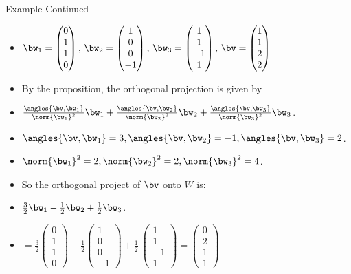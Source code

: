 \documentclass{beamer}
\begin{document}
\begin{frame}{Example Continued}
\begin{itemize}
\item $
\bw_1=
\begin{pmatrix}
0  \\
1  \\
1\\
0
\end{pmatrix}
\text{, }
\bw_2=
\begin{pmatrix}
1 \\
0\\
0 \\
-1
\end{pmatrix}
\text{, }
\bw_3=
\begin{pmatrix}
1 \\
1 \\
-1 \\
1
\end{pmatrix}
\text{, }
\bv=
\begin{pmatrix}
1 \\
1 \\
2 \\
2
\end{pmatrix}
$
\item By the proposition, the orthogonal projection is given by
\item $\frac{\angles{\bv,\bw_1}}{\norm{\bw_1}^2}\bw_1 + \frac{\angles{\bv,\bw_2}}{\norm{\bw_2}^2}\bw_2 + \frac{\angles{\bv,\bw_3}}{\norm{\bw_3}^2}\bw_3$.
\item $\angles{\bv,\bw_1}=3,\angles{\bv,\bw_2}=-1,\angles{\bv,\bw_3}=2$.
\item $\norm{\bw_1}^2=2,\norm{\bw_2}^2=2,\norm{\bw_3}^2=4$.
\item So the orthogonal project of $\bv$ onto $W$ is:
\item $\frac{3}{2}\bw_1 - \frac{1}{2}\bw_2 + \frac{1}{2}\bw_3$.
\item  $ =
\frac{3}{2}
\begin{pmatrix}
0  \\
1  \\
1\\
0
\end{pmatrix}
- \frac{1}{2}
\begin{pmatrix}
1 \\
0\\
0 \\
-1
\end{pmatrix}
+ \frac{1}{2}\
\begin{pmatrix}
1 \\
1 \\
-1 \\
1
\end{pmatrix}
=
\begin{pmatrix}
0 \\
2 \\
1 \\
1
\end{pmatrix}
$
\end{itemize}
\end{frame}
\end{document}
